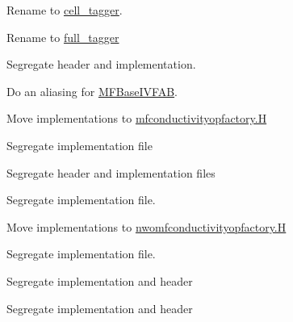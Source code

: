 
\begin{DoxyRefList}
\item[\label{todo__todo000010}%
\hypertarget{todo__todo000010}{}%
File \hyperlink{cell__tagger_8H}{cell\+\_\+tagger.H} ]Rename to \hyperlink{classcell__tagger}{cell\+\_\+tagger}.  
\item[\label{todo__todo000011}%
\hypertarget{todo__todo000011}{}%
File \hyperlink{full__tagger_8H}{full\+\_\+tagger.H} ]Rename to \hyperlink{classfull__tagger}{full\+\_\+tagger}  
\item[\label{todo__todo000003}%
\hypertarget{todo__todo000003}{}%
File \hyperlink{mfalias_8H}{mfalias.H} ]Segregate header and implementation. 

Do an aliasing for \hyperlink{classMFBaseIVFAB}{M\+F\+Base\+I\+V\+F\+AB}.  
\item[\label{todo__todo000001}%
\hypertarget{todo__todo000001}{}%
File \hyperlink{mfconductivityopfactory_8H}{mfconductivityopfactory.H} ]Move implementations to \hyperlink{mfconductivityopfactory_8H}{mfconductivityopfactory.\+H}  
\item[\label{todo__todo000004}%
\hypertarget{todo__todo000004}{}%
File \hyperlink{MFInterfaceFAB_8H}{M\+F\+Interface\+F\+AB.H} ]Segregate implementation file  
\item[\label{todo__todo000005}%
\hypertarget{todo__todo000005}{}%
File \hyperlink{MFLevelGrid_8H}{M\+F\+Level\+Grid.H} ]Segregate header and implementation files  
\item[\label{todo__todo000006}%
\hypertarget{todo__todo000006}{}%
File \hyperlink{MFQuadCFInterp_8H}{M\+F\+Quad\+C\+F\+Interp.H} ]Segregate implementation file.  
\item[\label{todo__todo000002}%
\hypertarget{todo__todo000002}{}%
File \hyperlink{nwomfconductivityopfactory_8H}{nwomfconductivityopfactory.H} ]Move implementations to \hyperlink{nwomfconductivityopfactory_8H}{nwomfconductivityopfactory.\+H}  
\item[\label{todo__todo000007}%
\hypertarget{todo__todo000007}{}%
File \hyperlink{NWOMFQuadCFInterp_8H}{N\+W\+O\+M\+F\+Quad\+C\+F\+Interp.H} ]Segregate implementation file.  
\item[\label{todo__todo000008}%
\hypertarget{todo__todo000008}{}%
File \hyperlink{tags_8H}{tags.H} ]Segregate implementation and header  
\item[\label{todo__todo000009}%
\hypertarget{todo__todo000009}{}%
File \hyperlink{tags__factory_8H}{tags\+\_\+factory.H} ]Segregate implementation and header 
\end{DoxyRefList}